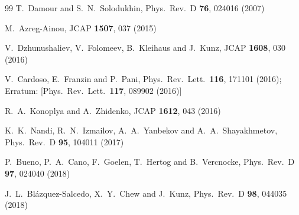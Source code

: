 \documentclass[aps,prd,12pt,superscriptaddress]{revtex4-2}
\begin{document}
\begin{thebibliography}{99}
  T.~Damour and S.~N.~Solodukhin,
  Phys.\ Rev.\ D {\bf 76}, 024016 (2007)

  M.~Azreg-Ainou,
  JCAP {\bf 1507}, 037 (2015)

  V.~Dzhunushaliev, V.~Folomeev, B.~Kleihaus and J.~Kunz,
  JCAP {\bf 1608}, 030 (2016)

  V.~Cardoso, E.~Franzin and P.~Pani,
  Phys.\ Rev.\ Lett.\  {\bf 116}, 171101 (2016);
  Erratum: [Phys.\ Rev.\ Lett.\  {\bf 117}, 089902 (2016)]

  R.~A.~Konoplya and A.~Zhidenko,
  JCAP {\bf 1612}, 043 (2016)

  K.~K.~Nandi, R.~N.~Izmailov, A.~A.~Yanbekov and A.~A.~Shayakhmetov,
  Phys.\ Rev.\ D {\bf 95}, 104011 (2017)

  P.~Bueno, P.~A.~Cano, F.~Goelen, T.~Hertog and B.~Vercnocke,
  Phys.\ Rev.\ D {\bf 97}, 024040 (2018)

  J.~L.~Bl\'{a}zquez-Salcedo, X.~Y.~Chew and J.~Kunz,
  Phys.\ Rev.\ D {\bf 98}, 044035 (2018)


\end{thebibliography}
\end{document}
